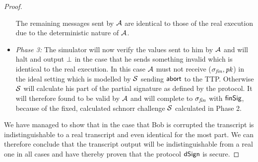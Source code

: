 \begin{proof}
\begin{itemize}
        The remaining messages sent by $\mathcal{A}$ are identical to those of the real execution due to the deterministic nature of $\mathcal{A}$.
        \item \textit{Phase 3: } The simulator will now verify the values sent to him by $\mathcal{A}$ and will halt and output $\bot$ in the case that he sends something invalid which is identical to the real execution.
        In this case $\mathcal{A}$ must not receive ($\sigma_{\mathit{fin}}, \mathit{pk}$) in the ideal setting which is modelled by $\mathcal{S}$ sending $\mathsf{abort}$ to the TTP.
        Otherwise $\mathcal{S}$ will calculate his part of the partial signature as defined by the protocol.
        It will therefore found to be valid by $\mathcal{A}$ and will complete to $\sigma_{\mathit{fin}}$ with $\mathsf{finSig}$, because of the fixed, calculated schnorr challenge $\mathcal{S}$ calculated in Phase 2.
    \end{itemize}

    We have managed to show that in the case that Bob is corrupted the transcript is indistinguishable to a real transcript and even identical for the most part.
    We can therefore conclude that the transcript output will be indistinguishable from a real one in all cases and have thereby proven that the protocol $\mathsf{dSign}$ is secure.
\end{proof}

